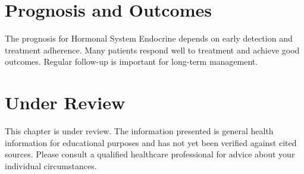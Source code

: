 \section*{Prognosis and Outcomes}
The prognosis for Hormonal System Endocrine depends on early detection and treatment adherence. Many patients respond well to treatment and achieve good outcomes. Regular follow-up is important for long-term management.
\section*{Under Review}
This chapter is under review. The information presented is general health information for educational purposes and has not yet been verified against cited sources. Please consult a qualified healthcare professional for advice about your individual circumstances.


\clearpage
